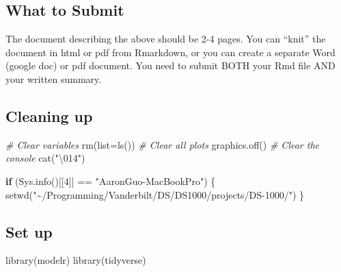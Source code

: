 \documentclass[
]{article}
\newenvironment{Shaded}{\begin{snugshade}}{\end{snugshade}}
\newcommand{\AttributeTok}[1]{\textcolor[rgb]{0.77,0.63,0.00}{#1}}
\newcommand{\CommentTok}[1]{\textcolor[rgb]{0.56,0.35,0.01}{\textit{#1}}}
\newcommand{\ControlFlowTok}[1]{\textcolor[rgb]{0.13,0.29,0.53}{\textbf{#1}}}
\newcommand{\DecValTok}[1]{\textcolor[rgb]{0.00,0.00,0.81}{#1}}
\newcommand{\FunctionTok}[1]{\textcolor[rgb]{0.00,0.00,0.00}{#1}}
\newcommand{\NormalTok}[1]{#1}
\newcommand{\SpecialCharTok}[1]{\textcolor[rgb]{0.00,0.00,0.00}{#1}}
\newcommand{\StringTok}[1]{\textcolor[rgb]{0.31,0.60,0.02}{#1}}
\begin{document}
\hypertarget{what-to-submit}{%
\subsection{What to Submit}\label{what-to-submit}}

The document describing the above should be 2-4 pages. You can ``knit''
the document in html or pdf from Rmarkdown, or you can create a separate
Word (google doc) or pdf document. You need to submit BOTH your Rmd file
AND your written summary.

\hypertarget{cleaning-up}{%
\subsection{Cleaning up}\label{cleaning-up}}

\begin{Shaded}
\begin{Highlighting}[]
\CommentTok{\# Clear variables}
\FunctionTok{rm}\NormalTok{(}\AttributeTok{list=}\FunctionTok{ls}\NormalTok{())}
\CommentTok{\# Clear all plots}
\FunctionTok{graphics.off}\NormalTok{()}
\CommentTok{\# Clear the console}
\FunctionTok{cat}\NormalTok{(}\StringTok{"}\SpecialCharTok{\textbackslash{}014}\StringTok{"}\NormalTok{)}
\end{Highlighting}
\end{Shaded}

\newpage{}

\begin{Shaded}
\begin{Highlighting}[]
\ControlFlowTok{if}\NormalTok{ (}\FunctionTok{Sys.info}\NormalTok{()[[}\DecValTok{4}\NormalTok{]] }\SpecialCharTok{==} \StringTok{"AaronGuo{-}MacBookPro"}\NormalTok{) \{}
  \FunctionTok{setwd}\NormalTok{(}\StringTok{"\textasciitilde{}/Programming/Vanderbilt/DS/DS1000/projects/DS{-}1000/"}\NormalTok{)}
\NormalTok{\}}
\end{Highlighting}
\end{Shaded}

\hypertarget{set-up}{%
\subsection{Set up}\label{set-up}}

\begin{Shaded}
\begin{Highlighting}[]
\FunctionTok{library}\NormalTok{(modelr)}
\FunctionTok{library}\NormalTok{(tidyverse)}
\end{Highlighting}
\end{Shaded}
\end{document}

